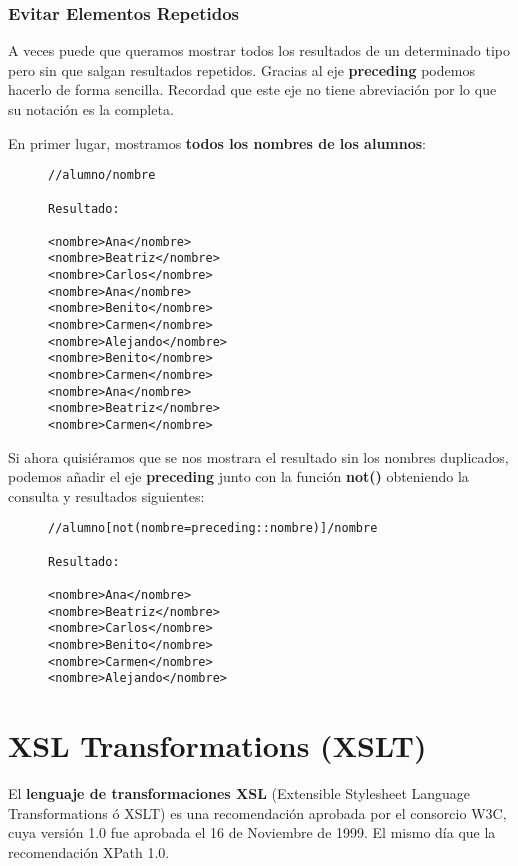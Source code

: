 \subsubsection{Evitar Elementos Repetidos}
A veces puede que queramos mostrar todos los resultados de un determinado tipo pero sin que salgan resultados repetidos. Gracias al eje \textbf{preceding} podemos hacerlo de forma sencilla. Recordad que este eje no tiene abreviación por lo que su notación es la completa.

En primer lugar, mostramos \textbf{todos los nombres de los alumnos}:

\begin{figure}[H]
    \begin{tcolorbox}[sharp corners, colback=yellow!30, colframe=white!20]
        \scriptsize
\begin{verbatim}
//alumno/nombre

Resultado:

<nombre>Ana</nombre>
<nombre>Beatriz</nombre>
<nombre>Carlos</nombre>
<nombre>Ana</nombre>
<nombre>Benito</nombre>
<nombre>Carmen</nombre>
<nombre>Alejando</nombre>
<nombre>Benito</nombre>
<nombre>Carmen</nombre>
<nombre>Ana</nombre>
<nombre>Beatriz</nombre>
<nombre>Carmen</nombre>
\end{verbatim}
    \end{tcolorbox}
\end{figure}

Si ahora quisiéramos que se nos mostrara el resultado sin los nombres duplicados, podemos añadir el eje \textbf{preceding} junto con la función \textbf{not()} obteniendo la consulta y resultados siguientes:

\begin{figure}[H]
    \begin{tcolorbox}[sharp corners, colback=yellow!30, colframe=white!20]
        \scriptsize
\begin{verbatim}
//alumno[not(nombre=preceding::nombre)]/nombre

Resultado:

<nombre>Ana</nombre>
<nombre>Beatriz</nombre>
<nombre>Carlos</nombre>
<nombre>Benito</nombre>
<nombre>Carmen</nombre>
<nombre>Alejando</nombre>
\end{verbatim}
    \end{tcolorbox}
\end{figure}

\section{XSL Transformations (XSLT)}
El \textbf{lenguaje de transformaciones XSL} (Extensible Stylesheet Language Transformations ó XSLT) es una recomendación aprobada por el consorcio W3C, cuya versión 1.0 fue aprobada el 16 de Noviembre de 1999. El mismo día que la recomendación XPath 1.0.

